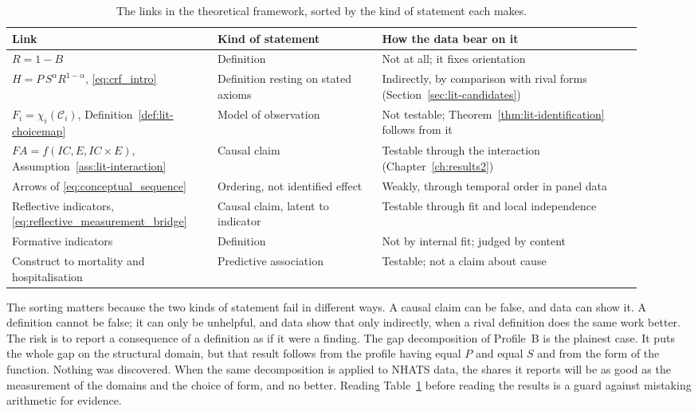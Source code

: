 \begin{table}[htbp]
\centering
\caption{The links in the theoretical framework, sorted by the kind of statement each makes.}
\label{tab:lit-links}
\footnotesize
\renewcommand{\arraystretch}{1.2}
\begin{tabular}{p{0.30\linewidth} p{0.24\linewidth} p{0.38\linewidth}}
\toprule
\textbf{Link} & \textbf{Kind of statement} & \textbf{How the data bear on it} \\
\midrule
$R=1-B$ & Definition & Not at all; it fixes orientation \\
\addlinespace
$H=P\,S^{\alpha}R^{1-\alpha}$, \eqref{eq:crf_intro} & Definition resting on stated axioms & Indirectly, by comparison with rival forms (Section~\ref{sec:lit-candidates}) \\
\addlinespace
$F_i=\chi_i(\mathcal C_i)$, Definition~\ref{def:lit-choicemap} & Model of observation & Not testable; Theorem~\ref{thm:lit-identification} follows from it \\
\addlinespace
$FA=f(IC,E,IC\times E)$, Assumption~\ref{ass:lit-interaction} & Causal claim & Testable through the interaction (Chapter~\ref{ch:results2}) \\
\addlinespace
Arrows of \eqref{eq:conceptual_sequence} & Ordering, not identified effect & Weakly, through temporal order in panel data \\
\addlinespace
Reflective indicators, \eqref{eq:reflective_measurement_bridge} & Causal claim, latent to indicator & Testable through fit and local independence \\
\addlinespace
Formative indicators & Definition & Not by internal fit; judged by content \\
\addlinespace
Construct to mortality and hospitalisation & Predictive association & Testable; not a claim about cause \\
\bottomrule
\end{tabular}
\end{table}

The sorting matters because the two kinds of statement fail in different ways. A causal claim can be false, and data can show it. A definition cannot be false; it can only be unhelpful, and data show that only indirectly, when a rival definition does the same work better. The risk is to report a consequence of a definition as if it were a finding. The gap decomposition of Profile~B is the plainest case. It puts the whole gap on the structural domain, but that result follows from the profile having equal $P$ and equal $S$ and from the form of the function. Nothing was discovered. When the same decomposition is applied to NHATS data, the shares it reports will be as good as the measurement of the domains and the choice of form, and no better. Reading Table~\ref{tab:lit-links} before reading the results is a guard against mistaking arithmetic for evidence.

